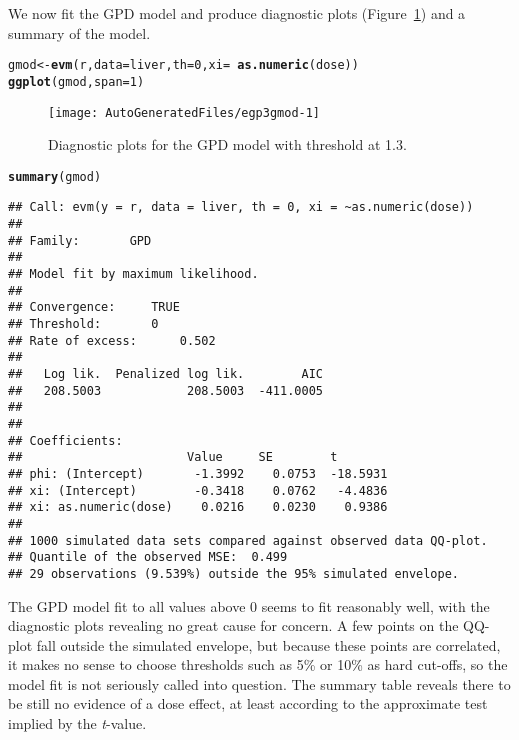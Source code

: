 \documentclass[a4paper]{article}\usepackage[]{graphicx}\usepackage[]{color}
\makeatletter
\def\maxwidth{ %
  \ifdim\Gin@nat@width>\linewidth
    \linewidth
  \else
    \Gin@nat@width
  \fi
}
\newcommand{\hlnum}[1]{\textcolor[rgb]{0.686,0.059,0.569}{#1}}%
\newcommand{\hlopt}[1]{\textcolor[rgb]{0,0,0}{#1}}%
\newcommand{\hlstd}[1]{\textcolor[rgb]{0.345,0.345,0.345}{#1}}%
\newcommand{\hlkwb}[1]{\textcolor[rgb]{0.69,0.353,0.396}{#1}}%
\newcommand{\hlkwc}[1]{\textcolor[rgb]{0.333,0.667,0.333}{#1}}%
\newcommand{\hlkwd}[1]{\textcolor[rgb]{0.737,0.353,0.396}{\textbf{#1}}}%
\newenvironment{kframe}{%
 \def\at@end@of@kframe{}%
 \ifinner\ifhmode%
  \def\at@end@of@kframe{\end{minipage}}%
  \begin{minipage}{\columnwidth}%
 \fi\fi%
 \def\FrameCommand##1{\hskip\@totalleftmargin \hskip-\fboxsep
 \colorbox{shadecolor}{##1}\hskip-\fboxsep
     \hskip-\linewidth \hskip-\@totalleftmargin \hskip\columnwidth}%
 \MakeFramed {\advance\hsize-\width
   \@totalleftmargin\z@ \linewidth\hsize
   \@setminipage}}%
 {\par\unskip\endMakeFramed%
 \at@end@of@kframe}
\newenvironment{knitrout}{}{} %
\makeatother
\begin{document}
We now fit the GPD model and produce diagnostic plots (Figure~\ref{fig:gmod}) and a summary of the model.
\begin{knitrout}
\color{fgcolor}\begin{kframe}
\begin{alltt}
\hlstd{gmod} \hlkwb{<-} \hlkwd{evm}\hlstd{(r,} \hlkwc{data}\hlstd{=liver,} \hlkwc{th}\hlstd{=}\hlnum{0}\hlstd{,} \hlkwc{xi}\hlstd{=}\hlopt{~}\hlkwd{as.numeric}\hlstd{(dose))}
\hlkwd{ggplot}\hlstd{(gmod,}\hlkwc{span}\hlstd{=}\hlnum{1}\hlstd{)}
\end{alltt}
\end{kframe}\begin{figure}
\texttt{[image: AutoGeneratedFiles/egp3gmod-1]} \caption[Diagnostic plots for the GPD model with threshold at 1.3]{Diagnostic plots for the GPD model with threshold at 1.3.}\label{fig:gmod}
\end{figure}

\begin{kframe}\begin{alltt}
\hlkwd{summary}\hlstd{(gmod)}
\end{alltt}
\begin{verbatim}
## Call: evm(y = r, data = liver, th = 0, xi = ~as.numeric(dose))
## 
## Family:       GPD 
## 
## Model fit by maximum likelihood.
## 
## Convergence:		TRUE
## Threshold:		0
## Rate of excess:		0.502
## 
##   Log lik.  Penalized log lik.        AIC
##   208.5003            208.5003  -411.0005
## 
## 
## Coefficients:
##                       Value     SE        t       
## phi: (Intercept)       -1.3992    0.0753  -18.5931
## xi: (Intercept)        -0.3418    0.0762   -4.4836
## xi: as.numeric(dose)    0.0216    0.0230    0.9386
## 
## 1000 simulated data sets compared against observed data QQ-plot.
## Quantile of the observed MSE:  0.499 
## 29 observations (9.539%) outside the 95% simulated envelope.
\end{verbatim}
\end{kframe}
\end{knitrout}

The GPD model fit to all values above 0 seems to fit reasonably well, with the diagnostic plots
revealing no great cause for concern. A few points on the QQ-plot fall outside
the simulated envelope, but because these points are correlated, it makes no
sense to choose thresholds such as 5\% or 10\% as hard cut-offs, so the model
fit is not seriously called into question. The summary table reveals there to
be still no evidence of a dose
effect, at least according to the approximate test implied by the {\em t}-value.
\end{document}
